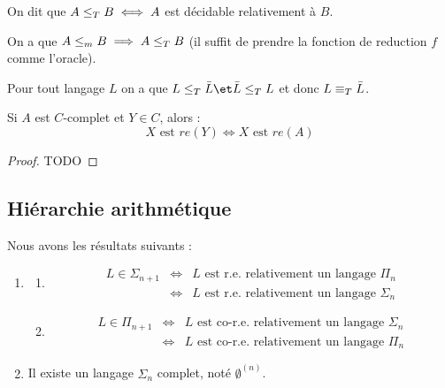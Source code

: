 \begin{definition}
	On dit que $A \leq_T B \iff A$ est décidable relativement à $B$.
\end{definition}

\begin{remarque}
	On a que $A \leq_m B \implies A \leq_T B$ (il suffit de prendre la fonction de reduction $f$ comme l'oracle).
\end{remarque}

\begin{remarque}
	Pour tout langage $L$ on a que $L \leqt \bar L \et \bar L \leqt L$ et donc $L \equiv_T \bar L$.
\end{remarque}


\begin{lemma} \label{lem:trans-turing}
	Si $A$ est $C$-complet et $Y \in C$, alors :
	$$X \text{ est } re(Y) \iff X \text{ est } re(A)$$
\end{lemma}

\begin{proof}
	TODO
\end{proof}


\subsection{Hiérarchie arithmétique}

\begin{theorem}[de Post]
	Nous avons les résultats suivants :
	\begin{enumerate}
		\item \label{thm:post-1}
		      \begin{enumerate}
			      \item \label{thm:post-1a}
			            \begin{eqnarray*}
				            L \in \Sigma_{n+1} &\iff& L \text{ est r.e. relativement  un langage }  \Pi_n  \\
				            &\iff& L \text{ est r.e. relativement  un langage }  \Sigma_{n}
			            \end{eqnarray*}

			      \item
			            \begin{eqnarray*}
				            L \in \Pi_{n+1} &\iff& L \text{ est co-r.e. relativement  un langage }  \Sigma_n  \\
				            &\iff& L \text{ est co-r.e. relativement  un langage }  \Pi_n
			            \end{eqnarray*}
		      \end{enumerate}

		\item Il existe un langage $\Sigma_n$ complet, noté $\emptyset^{(n)}$. \label{thm:post-2}
	\end{enumerate}
\end{theorem}


